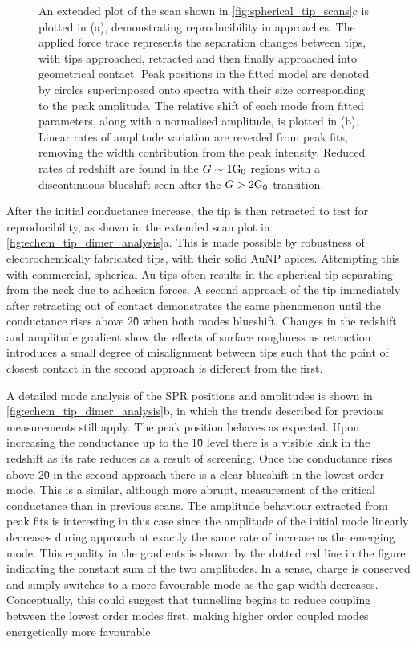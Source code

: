 \documentclass[a4paper]{article}
\begin{document}
\begin{figure}[bt]
{An extended plot of the  scan shown in \autoref{fig:spherical_tip_scans}c is plotted in (a), demonstrating reproducibility in approaches. The applied force trace represents the separation changes between tips, with tips approached, retracted and then finally approached into geometrical contact. Peak positions in the fitted model are denoted by circles superimposed onto spectra with their size corresponding to the peak amplitude. The relative shift of each mode from fitted parameters, along with a normalised amplitude, is plotted in (b). Linear rates of amplitude variation are revealed from peak fits, removing the width contribution from the peak intensity. Reduced rates of redshift are found in the $G\sim1\mathrm{G_{0}}$ regions with a discontinuous blueshift seen after the $G>2\mathrm{G_{0}}$ transition.}
\label{fig:echem_tip_dimer_analysis}
\end{figure}

After the initial conductance increase, the tip is then retracted to test for reproducibility, as shown in the extended scan plot in \autoref{fig:echem_tip_dimer_analysis}a. This is made possible by robustness of electrochemically fabricated tips, with their solid AuNP apices. Attempting this with commercial, spherical Au tips often results in the spherical tip separating from the neck due to adhesion forces. A second approach of the tip immediately after retracting out of contact demonstrates the same phenomenon until the conductance rises above 2\G0 when both modes blueshift. Changes in the redshift and amplitude gradient show the effects of surface roughness as retraction introduces a small degree of misalignment between tips such that the point of closest contact in the second approach is different from the first.

A detailed mode analysis of the SPR positions and amplitudes is shown in \autoref{fig:echem_tip_dimer_analysis}b, in which the trends described for previous measurements still apply. The peak position behaves as expected. Upon increasing the conductance up to the 1\G0 level there is a visible kink in the redshift as its rate reduces as a result of screening. Once the conductance rises above 2\G0 in the second approach there is a clear blueshift in the lowest order mode. This is a similar, although more abrupt, measurement of the critical conductance than in previous scans. The amplitude behaviour extracted from peak fits is interesting in this case since the amplitude of the initial mode linearly decreases during approach at exactly the same rate of increase as the emerging mode. This equality in the gradients is shown by the dotted red line in the figure indicating the constant sum of the two amplitudes. In a sense, charge is conserved and simply switches to a more favourable mode as the gap width decreases. Conceptually, this could suggest that tunnelling begins to reduce coupling between the lowest order modes first, making higher order coupled modes energetically more favourable.
\end{document}
